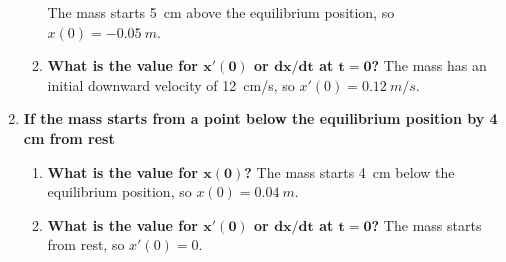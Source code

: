 \documentclass[12pt]{article}
\begin{document}
\begin{enumerate}
\begin{enumerate}[\bfseries a.]
          The mass starts \SI{5}{cm} above the equilibrium position, so \(x(0) = \SI{-0.05}{m}\).
        \item \textbf{What is the value for \(\bm{x'(0)}\) or \(\bm{\text{d}x/\text{d}t}\) at \(\bm{t = 0}\)?}
          The mass has an initial downward velocity of \SI{12}{cm/s}, so \(x'(0) = \SI{0.12}{m/s}\).
      \end{enumerate}
    \item \textbf{If the mass starts from a point below the equilibrium position by 4 cm from rest}
      \begin{enumerate}[\bfseries a.]
        \item \textbf{What is the value for \(\bm{x(0)}\)?}
          The mass starts \SI{4}{cm} below the equilibrium position, so \(x(0) = \SI{0.04}{m}\).
        \item \textbf{What is the value for \(\bm{x'(0)}\) or \(\bm{\text{d}x/\text{d}t}\) at \(\bm{t = 0}\)?}
          The mass starts from rest, so \(x'(0) = 0\).
      \end{enumerate}
  \end{enumerate}
\end{document}
